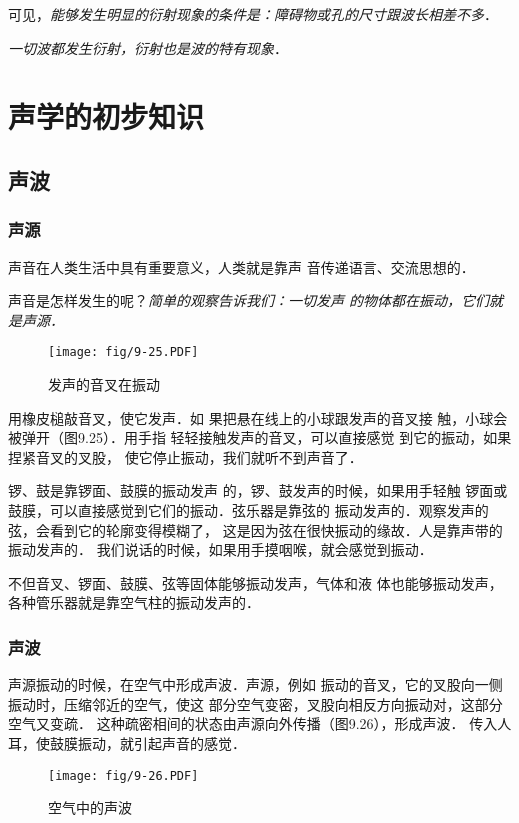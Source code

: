 可见，\textit{能够发生明显的衍射现象的条件是：障碍物或孔的尺寸跟波长相差不多}．

\textit{一切波都发生衍射，衍射也是波的特有现象}．

\section{声学的初步知识}
\subsection{声波}
\subsubsection{声源} 

声音在人类生活中具有重要意义，人类就是靠声
音传递语言、交流思想的．

声音是怎样发生的呢？\textit{简单的观察告诉我们：一切发声
的物体都在振动，它们就是声源．}
\begin{figure}[htp]\centering
    \texttt{[image: fig/9-25.PDF]}
    \caption{发声的音叉在振动}
    \end{figure}

用橡皮槌敲音叉，使它发声．如
果把悬在线上的小球跟发声的音叉接
触，小球会被弹开（图9.25）．用手指
轻轻接触发声的音叉，可以直接感觉
到它的振动，如果捏紧音叉的叉股，
使它停止振动，我们就听不到声音了．

锣、鼓是靠锣面、鼓膜的振动发声
的，锣、鼓发声的时候，如果用手轻触
锣面或鼓膜，可以直接感觉到它们的振动．弦乐器是靠弦的
振动发声的．观察发声的弦，会看到它的轮廓变得模糊了，
这是因为弦在很快振动的缘故．人是靠声带的振动发声的．
我们说话的时候，如果用手摸咽喉，就会感觉到振动．

不但音叉、锣面、鼓膜、弦等固体能够振动发声，气体和液
体也能够振动发声，各种管乐器就是靠空气柱的振动发声的．

\subsubsection{声波} 

声源振动的时候，在空气中形成声波．声源，例如
振动的音叉，它的叉股向一侧振动时，压缩邻近的空气，使这
部分空气变密，叉股向相反方向振动对，这部分空气又变疏．
这种疏密相间的状态由声源向外传播（图9.26），形成声波．
传入人耳，使鼓膜振动，就引起声音的感觉．
\begin{figure}[htp]\centering
    \texttt{[image: fig/9-26.PDF]}
    \caption{空气中的声波}
    \end{figure}

